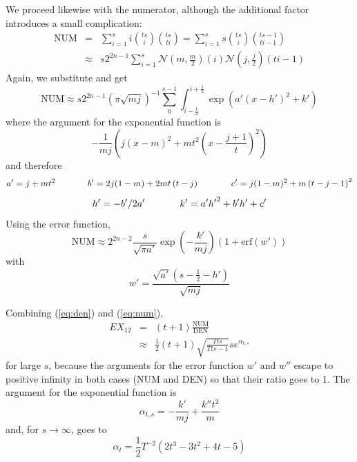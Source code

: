 \documentclass[smallextended]{svjour3}       %
\newcommand{\erf}[0]{\mbox{erf}}
\newcommand{\anum}[0]{a'}
\newcommand{\bnum}[0]{b'}
\newcommand{\cnum}[0]{c'}
\newcommand{\hnum}[0]{h'}
\newcommand{\knum}[0]{k'}
\newcommand{\wnum}[0]{w'}
\newcommand{\kden}[0]{k''}
\begin{document}
We proceed likewise with the numerator, although the additional factor
introduces a small complication:
  \begin{eqnarray*}
  \mbox{NUM}&=&\sum_{i=1}^{s}i\binom{ts}{i}\binom{ts}{ti}=\sum_{i=1}^{s}s\binom{ts}{i}\binom{ts-1}{ti-1}\\
&\approx&s2^{2n-1}\sum_{i=1}^{s}\mathcal{N}\left(m,\frac{m}{2}\right)(i)\mathcal{N}\left(j,\frac{j}{2}\right)(ti-1)
\end{eqnarray*}
Again, we substitute and get
\begin{displaymath}
  \mbox{NUM}\approx{}s2^{2n-1}\left(\pi\sqrt{mj}\right)^{-1}\sum_{0}^{s-1}\int_{i-\frac{1}{2}}^{i+\frac{1}{2}}\exp\left({\anum}(x-{\hnum})^{2}+{\knum}\right)
\end{displaymath}
where the argument for the exponential function is
\begin{displaymath}
  -\frac{1}{mj}\left(j(x-m)^{2}+mt^{2}\left(x-\frac{j+1}{t}\right)^{2}\right)
\end{displaymath}
and therefore
\begin{displaymath}
{\anum}=j+mt^{2}\hspace{.5in}
{\bnum}=2j(1-m)+2mt\left(t-j\right)\hspace{.5in}
{\cnum}=j(1-m)^{2}+m\left(t-j-1\right)^{2}
\end{displaymath}
\begin{displaymath}
{\hnum}=-{\bnum}/2{\anum}\hspace{.5in}
{\knum}={\anum}{\hnum}^{2}+{\bnum}{\hnum}+{\cnum}
\end{displaymath}
Using the error function, 
\begin{equation}
  \label{eq:num}
  \mbox{NUM}\approx{}2^{2n-2}\frac{s}{\sqrt{\pi{}{\anum}}}\exp\left(-\frac{{\knum}}{mj}\right)\left(1+\erf({\wnum})\right)
\end{equation}
with
\begin{displaymath}
  {\wnum}=\frac{\sqrt{{\anum}}\left(s-\frac{1}{2}-{\hnum}\right)}{\sqrt{mj}}
\end{displaymath}

Combining ({\ref{eq:den}}) and ({\ref{eq:num}}),
\begin{eqnarray*}
  EX_{12}&=&(t+1)\frac{\mbox{NUM}}{\mbox{DEN}}\\
&\approx&\frac{1}{2}(t+1)\sqrt{\frac{{T}{}ts}{{T}{}ts-1}}se^{\alpha_{t,s}}
\end{eqnarray*}
for large $s$, because the arguments for the error function $w'$ and
$w''$ escape to positive infinity in both cases (NUM and DEN) so that
their ratio goes to 1. The argument for the exponential function is
\begin{displaymath}
  \alpha_{t,s}=-\frac{{\knum}}{mj}+\frac{{\kden}t^{2}}{m}
\end{displaymath}
and, for $s\rightarrow\infty$, goes to
\begin{displaymath}
  \alpha_{t}=\frac{1}{2}{T}^{-2}(2t^{3}-3t^{2}+4t-5)
\end{displaymath}
\end{document}
